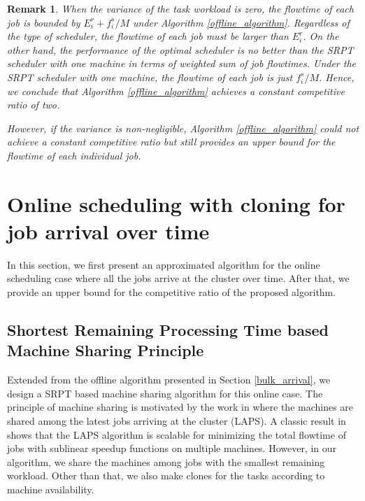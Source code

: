 \documentclass[10pt,conference,compsocconf,letterpaper]{IEEEtran}
\newtheorem{remark}{Remark}
\begin{document}
\begin{remark}
When the variance of the task workload is zero, the flowtime of each job is bounded by $E^r_i + f_i^s/M$ under Algorithm \ref{offline_algorithm}. Regardless of the type of 
scheduler, the flowtime of each job must be larger than $E^r_i$. On the other hand, the performance of the optimal scheduler is no better than the SRPT scheduler with one machine in terms of weighted sum of job flowtimes. Under the SRPT scheduler with one machine, the flowtime of each job is just $f_i^s/M$. Hence, we conclude that Algorithm \ref{offline_algorithm} achieves a constant competitive ratio of two.

However, if the variance is non-negligible, Algorithm \ref{offline_algorithm} could not achieve a constant competitive ratio but still provides an upper bound for the flowtime of each individual job.
\end{remark}




\section{Online scheduling with cloning for job arrival over time}
\label{online-scheduling}
\vspace{-.3em}

In this section, we first present an approximated algorithm for the online scheduling case where all the jobs arrive at the cluster over time. After that, we
provide an upper bound for the competitive ratio of the proposed algorithm.

\subsection{Shortest Remaining Processing Time based Machine Sharing Principle}
\label{algorithm_design}
Extended from the offline algorithm presented in Section \ref{bulk_arrival},  we design a SRPT based machine sharing algorithm for this online case. The principle of machine sharing  is motivated by the work in \cite{scalably-scheduling,Reduce_variance,energy_efficient} where the machines are shared among the latest jobs arriving at the cluster (LAPS).
A classic result in \cite{scalably-scheduling} shows that
the LAPS algorithm  is scalable for minimizing the total flowtime of jobs with sublinear speedup functions on multiple machines. However, in our algorithm, we share the machines among jobs with the smallest remaining workload.  Other than that, we also make clones for the tasks according to machine availability.
\end{document}
